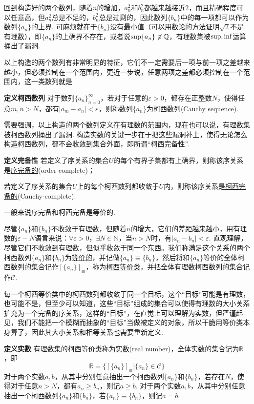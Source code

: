 \documentclass[UTF8]{ctexart}
\newcommand{\trm}[1]{{\rm #1}}
\newenvironment{definition}[1]
    {\begin{tcolorbox}[enhanced, colback=LightYellow, breakable=false, frame hidden, borderline west={1.5mm}{-2mm}{DarkGreen}]
    {\bfseries {\color{DarkGreen} 定义}\quad #1} \newline}
    {\end{tcolorbox}}
\begin{document}
回到构造好的两个数列，随着\(n\)的增加，\(a_n^2\)和\(b_n^2\)都越来越接近\(2\)，而且精确程度可以任意高，但\(a_n^2\)总是不足的，\(b_n^2\)总是过剩的，因此数列\(\{b_n\}\)中的每一项都可以作为数列\(\{a_n\}\)的上界. 可麻烦就在于\(\{b_n\}\)没有最小值（可以用数论的方法证明\(\sqrt{2}\)不是有理数），即\(\{a_n\}\)的上确界不存在，或者说\(\trm{sup}\{a_n\}\not \in \mathbb{Q}\)，有理数集被\(\trm{sup},\trm{inf}\)运算捅出了漏洞.

以上构造的两个数列有非常明显的特征，它们不一定需要后一项与前一项之差越来越小，但必须控制在一个范围内，更近一步说，任意两项之差都必须控制在一个范围内，这一类数列就是
\begin{definition}{柯西数列}
    对于数列\(\{a_n\}_{n=0}^{\infty}\)，若对于任意的\(\varepsilon>0\)，都存在正整数\(N\)，使得任意\(m,n>N\)，都有\(|a_{m}-a_{n}| < \varepsilon\)，则称数列\(\{a_n\}\)为\uline{柯西数列}(Cauchy sequence).
\end{definition}
需要强调，以上构造的两个数列定义在有理数的范围内，现在也可以说，有理数集被柯西数列捅出了漏洞. 构造实数的关键一步在于把这些漏洞补上，使得无论怎么构造柯西数列，都不会收敛到集合外面，即所谓“柯西完备性”.

\begin{definition}{完备性}
    若定义了序关系的集合\(U\)的每个有界子集都有上确界，则称该序关系是\uline{序完备的}(order-complete)；
    \par
    若定义了序关系的集合\(U\)上的每个柯西数列都收敛于\(U\)内，则称该序关系是\uline{柯西完备的}(Cauchy-complete).
\end{definition}

一般来说序完备和柯西完备是等价的.

尽管\(\{a_n\}\)和\(\{b_n\}\)不收敛于有理数，但随着\(n\)的增大，它们的差距越来越小，用有理数的\(\varepsilon-N\)语言来说：\(\forall \varepsilon > 0\)，\(\exists N\in \mathbb{N}\)，当\(n > N\)时，有\(|a_n-b_n|<\varepsilon\). 直观理解，尽管它们不收敛到有理数，但似乎收敛于同一个东西。我们称满足这个关系的两个柯西数列\(\{a_n\}\)和\(\{b_n\}\)为\uline{等价的}，并记做\(\{a_n\} \equiv \{b_n\}\)，然后将和\(\{a_n\}\)等价的全体柯西数列的集合记作\([\{a_n\}]_{\equiv}\)，称为\uline{柯西等价类}，并把全体有理数柯西数列的集合记作\(\mathcal{C}\).

每一个柯西等价类中的柯西数列都收敛于同一个目标，这个“目标”可能是有理数，也可能不是，但至少可以知道，这些“目标”组成的集合可以使得有理数的大小关系扩充为一个完备的序关系，这样的“目标”，在直觉上可以理解为实数，但严谨起见，我们不能把一个模糊而抽象的“目标”当做被定义的对象，所以干脆用等价类本身算了，因此其大小关系和相等关系也需要重新定义.
\begin{definition}{实数}
    有理数集的柯西等价类称为\uline{实数}(real number)，全体实数的集合记为\(\mathbb{R}\)，即
    \[\mathbb{R} = \{[\{a_n\}]_{\equiv} | \{a_n\}\in \mathcal{C}\}\]
    \newline
    对于两个实数\(a,b\)，从其中分别任意抽出一个柯西数列\(\{a_n\}\)和\(\{b_n\}\)，若存在\(N\)，使得对于任意\(n>N\)，都有\(a_n \geq b_n\)，则记\(a \geq b\).
    \newline
    对于两个实数\(a,b\)，从其中分别任意抽出一个柯西数列\(\{a_n\}\)和\(\{b_n\}\)，若\(\{a_n\} \equiv \{b_n\}\)，则记\(a=b\).
\end{definition}
\end{document}
